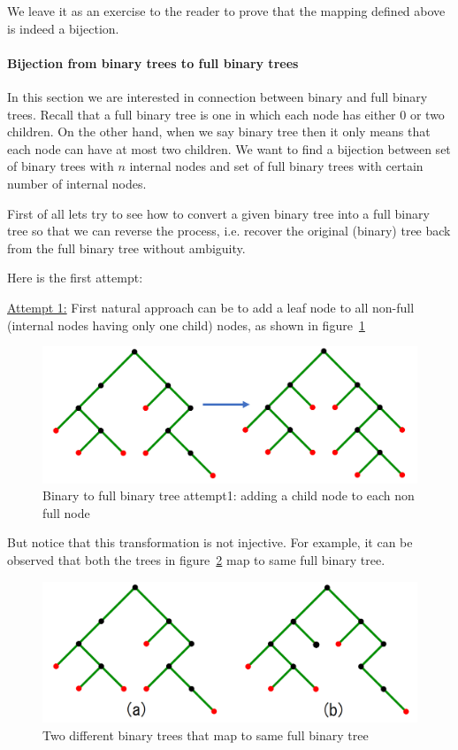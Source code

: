 We leave it as an exercise to the reader to prove that the mapping defined above is indeed a bijection.

\paragraph{Bijection from binary trees to full binary trees}
In this section we are interested in connection between binary and full binary trees. Recall that a full binary tree is one in which each node has either 0 or two children. On the other hand, when we say binary tree then it only means that each node can have at most two children. We want to find a bijection between set of binary trees with $n$ internal nodes and set of full binary trees with certain number of internal nodes. 

First of all lets try to see how to convert a given binary tree into a full binary tree so that we can reverse the process, i.e. recover the original (binary) tree back from the full binary tree without ambiguity. 

Here is the first attempt:

\noindent \underline{Attempt 1:} First natural approach can be to add a leaf node to all non-full (internal nodes having only one child) nodes, as shown in figure~\ref{fig:bt-fbt-attempt1}
\begin{figure}[h!]
    \centering
    \includegraphics[width=0.7\linewidth]{binary-to-full-binary-1.png}
    \caption{Binary to full binary tree attempt1: adding a child node to each non full node}
    \label{fig:bt-fbt-attempt1}
\end{figure}

But notice that this transformation is not injective. For example, it can be observed that  both the trees in figure~\ref{fig:bt-fbt-attempt1-issue} map to same full binary tree.
\begin{figure}[h!]
    \centering
    \includegraphics[width=0.7\linewidth]{binary-to-full-binary-2.png}
    \caption{Two different binary trees that map to same full binary tree}
    \label{fig:bt-fbt-attempt1-issue}
\end{figure}

